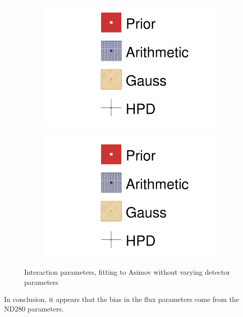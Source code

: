 \begin{figure}[h]
	\begin{subfigure}[t]{0.49\textwidth}
		\includegraphics[width=\textwidth,page=20, trim={0mm 0mm 0mm 9mm}, clip]{figures/mach3/2018/asimov/2018a_MultiPi_Binningv6_NewCov_Asimov_NoDet_merge_drawPar}
	\end{subfigure}
	\begin{subfigure}[t]{0.49\textwidth}
		\includegraphics[width=\textwidth,page=21, trim={0mm 0mm 0mm 9mm}, clip]{figures/mach3/2018/asimov/2018a_MultiPi_Binningv6_NewCov_Asimov_NoDet_merge_drawPar}
	\end{subfigure}
	\caption{Interaction parameters, fitting to Asimov without varying detector parameters}
	\label{fig:asimov_fit_2018_nodet_xsec}
\end{figure}

In conclusion, it appears that the bias in the flux parameters come from the ND280 parameters. 

